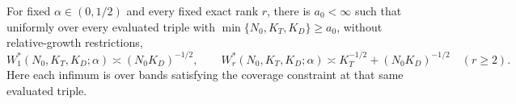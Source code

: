 For fixed \(\alpha\in(0,1/2)\) and every fixed exact rank \(r\), there is \(a_0<\infty\) such that uniformly over every evaluated triple with \(\min\{N_0,K_T,K_D\}\ge a_0\), without relative-growth restrictions, \[W_1^*(N_0,K_T,K_D;\alpha)\asymp(N_0K_D)^{-1/2},\qquad W_r^*(N_0,K_T,K_D;\alpha)\asymp K_T^{-1/2}+(N_0K_D)^{-1/2}\quad(r\ge2).\] Here each infimum is over bands satisfying the coverage constraint at that same evaluated triple.